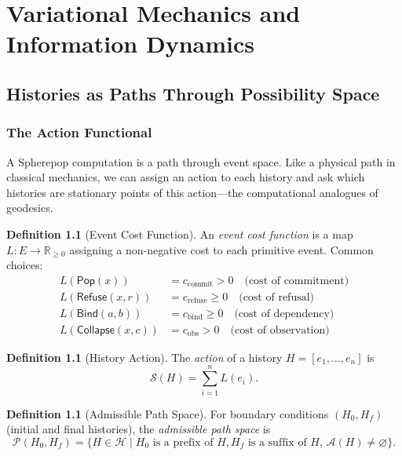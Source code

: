 \documentclass[12pt, a4paper, openany]{book}
\theoremstyle{plain}
\theoremstyle{definition}
\newtheorem{definition}[theorem]{Definition}
\theoremstyle{remark}
\newcommand{\Pop}{\mathsf{Pop}}
\newcommand{\Refuse}{\mathsf{Refuse}}
\newcommand{\Bind}{\mathsf{Bind}}
\newcommand{\Collapse}{\mathsf{Collapse}}
\newcommand{\calH}{\mathcal{H}}
\newcommand{\calA}{\mathcal{A}}
\begin{document}
\part{Variational Mechanics and Information Dynamics}

\chapter{Histories as Paths Through Possibility Space}

\section{The Action Functional}

A Spherepop computation is a path through event space. Like a physical path in
classical mechanics, we can assign an action to each history and ask which
histories are stationary points of this action---the computational analogues of
geodesics.

\begin{definition}[Event Cost Function]
An \emph{event cost function} is a map $L : E \to \mathbb{R}_{\geq 0}$ assigning
a non-negative cost to each primitive event. Common choices:
\begin{align*}
L(\Pop(x)) &= c_{\mathrm{commit}} > 0 \quad\text{(cost of commitment)} \\
L(\Refuse(x, r)) &= c_{\mathrm{refuse}} \geq 0 \quad\text{(cost of refusal)} \\
L(\Bind(a, b)) &= c_{\mathrm{bind}} \geq 0 \quad\text{(cost of dependency)} \\
L(\Collapse(x, c)) &= c_{\mathrm{obs}} > 0 \quad\text{(cost of observation)}
\end{align*}
\end{definition}

\begin{definition}[History Action]
The \emph{action} of a history $H = [e_1, \ldots, e_n]$ is
\[
\mathcal{S}(H) = \sum_{i=1}^{n} L(e_i).
\]
\end{definition}

\begin{definition}[Admissible Path Space]
For boundary conditions $(H_0, H_f)$ (initial and final histories), the
\emph{admissible path space} is
\[
\mathcal{P}(H_0, H_f) = \{H \in \calH \mid H_0 \text{ is a prefix of } H,
H_f \text{ is a suffix of } H,\, \calA(H) \neq \varnothing\}.
\]
\end{definition}
\end{document}

